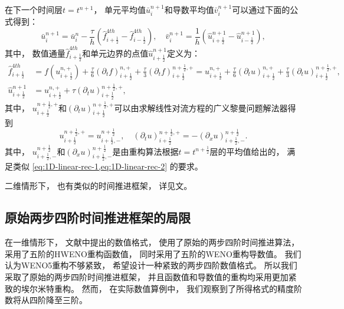 在下一个时间层$t=t^{n+1}$，
单元平均值$\bar{u}_{i}^{n+1}$和导数平均值$\bar{v}_{i}^{n+1}$可以通过下面的公式得到：
\begin{equation}
  \bar{u}_{i}^{n+1}=\bar{u}_{i}^{n}-\frac{\tau}{ h} \left(\hat{f}_{i+\frac 12}^{4th}-\hat{f}_{i-\frac 12}^{4th}\right), \quad
  \bar{v}_{i}^{n+1}=\frac{1}{h} \left(\hat u_{i+\frac 12}^{n+1}-\hat u_{i-\frac 12}^{n+1}\right),
\end{equation}
其中，
数值通量$\hat{f}_{i+\frac 12}^{4th}$和单元边界的点值$\hat u_{i+\frac 12}^{n+1}$定义为：
\begin{align}
  \hat{f}^{4th}_{i+\frac{1}{2}}
   & ={f} \left(u_{i+\frac{1}{2}}^{n, +}\right) +\frac{\tau}{6} \left({\partial_{t}}{f}\right)_{i+\frac{1}{2}}^{n, +}+\frac{\tau}{3} \left({\partial_{t}}{f}\right)_{i+\frac{1}{2}}^{n+\frac12, +}
  =u_{i+\frac{1}{2}}^{n, +} +\frac{\tau}{6} \left({\partial_{t}}{u}\right)_{i+\frac{1}{2}}^{n, +}+\frac{\tau}{3} \left({\partial_{t}}{u}\right)_{i+\frac{1}{2}}^{n+\frac12, +},                     \\
  \hat u_{i+\frac{1}{2}}^{n+1}
   & =u_{i+\frac{1}{2}}^{n, +}+\tau \left({\partial_{t}}u\right)_{i+\frac{1}{2}}^{n+\frac{1}{2}, +},
\end{align}
其中，
$u_{i+\frac{1}{2}}^{n+\frac{1}{2}, +}$和$\left({\partial_{t}}u\right)_{i+\frac{1}{2}}^{n+\frac{1}{2}, +}$可以由求解线性对流方程的广义黎曼问题解法器得到
\begin{equation}
  u_{i+\frac{1}{2}}^{n+\frac{1}{2}, +} = u_{i+\frac{1}{2},-}^{n+\frac{1}{2}},\quad
  \left({\partial_{t}}u\right)_{i+\frac{1}{2}}^{n+\frac{1}{2}, +} =
  -\left({\partial_{x}}u\right)_{i+\frac{1}{2},-}^{n+\frac{1}{2}}.
\end{equation}
其中，
$u_{i+\frac{1}{2},-}^{n+\frac{1}{2}}$和$\left({\partial_{x}}u\right)_{i+\frac{1}{2},-}^{n+\frac{1}{2}}$是由重构算法根据$t=t^{n+\frac{1}{2}}$层的平均值给出的，
满足类似 \cref{eq:1D-linear-rec-1,eq:1D-linear-rec-2} 的要求。
\vspace{0.3\baselineskip} %

二维情形下，
也有类似的时间推进框架，
详见文\cite{li2016two}。

\subsection{原始两步四阶时间推进框架的局限}

在一维情形下，
文献\cite{li2016two}中提出的数值格式，
使用了原始的两步四阶时间推进算法，
采用了五阶的HWENO重构函数值，
同时采用了五阶的WENO重构导数值。
我们认为WENO5重构不够紧致，
希望设计一种紧致的两步四阶数值格式。
所以我们采取了原始的两步四阶时间推进框架，
并且函数值和导数值的重构均采用更加紧致的埃尔米特重构。
然而，
在实际数值算例中，
我们观察到了所得格式的精度阶数将从四阶降至三阶。

